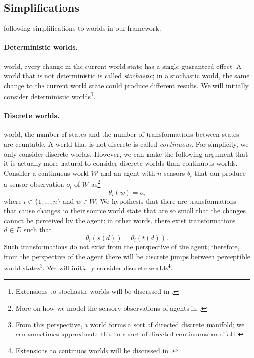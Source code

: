 
\subsection{Simplifications}

 following simplifications to worlds in our framework.

\paragraph{Deterministic worlds.}
 world, every change in the current world state has a single guaranteed effect.
A world that is not deterministic is called \emph{stochastic}; in a stochastic world, the same change to the current world state could produce different results.
We will initially consider deterministic worlds\footnote{Extensions to stochastic worlds will be discussed in .
}.

\paragraph{Discrete worlds.}
 world, the number of states and the number of transformations between states are countable.
A world that is not discrete is called \emph{continuous}.
For simplicity, we only consider discrete worlds.
However, we can make the following argument that it is actually more natural to consider discrete worlds than continuous worlds.
Consider a continuous world $\mathscr{W}$ and an agent with $n$ sensors $\theta_{i}$ that can produce a sensor observation $o_{i}$ of $\mathscr{W}$ as\footnote{
More on how we model the sensory observations of agents in .
}
\begin{equation}
	\theta_{i}(w) = o_{i}
\end{equation}
where $i \in \{1, ..., n\}$ and $w \in W$.
We hypothesis that there are transformations that cause changes to their source world state that are so small that the changes cannot be perceived by the agent; in other words, there exist transformations $d \in D$ such that
\begin{equation}
	\theta_{i}(s(d)) = \theta_{i}(t(d)).
\end{equation}
Such transformations do not exist from the perspective of the agent; therefore, from the perspective of the agent there will be discrete jumps between perceptible world states\footnote{
From this perspective, a world forms a sort of directed discrete manifold; we can sometimes approximate this to a sort of directed continuous manifold.
}.
We will initially consider discrete worlds\footnote{Extensions to continuos worlds will be discussed in .
}.

